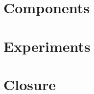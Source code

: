 \chapter{Components} \label{c:Components}				%

\chapter{Experiments}		%



\chapter{Closure} \label{c:Closure}			


\appendix
\printindex					%
\listoffigures				%
\printbibliography[			%
	heading=bibintoc,
	title={Bibliography}]
	

%
	
